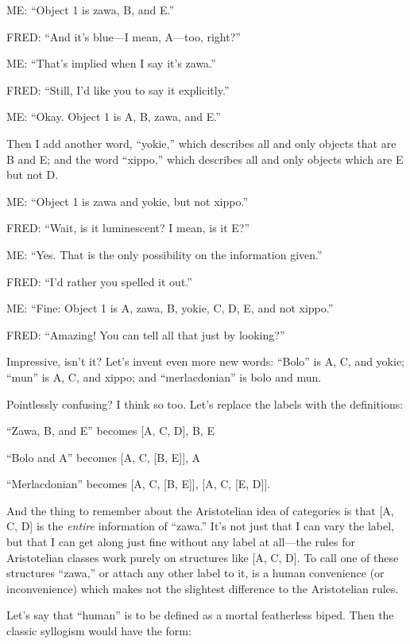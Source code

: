 {
 ME: ``Object 1 is zawa, B, and
E.''}

{
 FRED: ``And it's blue---I mean,
A---too, right?''}

{
 ME: ``That's implied when I say
it's zawa.''}

{
 FRED: ``Still, I'd like you to
say it explicitly.''}

{
 ME: ``Okay. Object 1 is A, B, zawa, and
E.''}

{
 Then I add another word,
``yokie,'' which describes all and
only objects that are B and E; and the word
``xippo,'' which describes all and
only objects which are E but not D.}

{
 ME: ``Object 1 is zawa and yokie, but not
xippo.''}

{
 FRED: ``Wait, is it luminescent? I mean, is it
E?''}

{
 ME: ``Yes. That is the only possibility on the
information given.''}

{
 FRED: ``I'd rather you spelled it
out.''}

{
 ME: ``Fine: Object 1 is A, zawa, B, yokie, C, D,
E, and not xippo.''}

{
 FRED: ``Amazing! You can tell all that just by
looking?''}

{
 Impressive, isn't it? Let's invent
even more new words: ``Bolo'' is A,
C, and yokie; ``mun'' is A, C, and
xippo; and ``merlacdonian'' is bolo
and mun.}

{
 Pointlessly confusing? I think so too. Let's
replace the labels with the definitions:}

{
 ``Zawa, B, and E'' becomes [A,
C, D], B, E}

{
 ``Bolo and A'' becomes [A, C,
[B, E]], A}

{
 ``Merlacdonian'' becomes [A, C,
[B, E]], [A, C, [E, {\textlnot}D]].}

{
 And the thing to remember about the Aristotelian idea of
categories is that [A, C, D] is the \textit{entire} information of
``zawa.'' It's not
just that I can vary the label, but that I can get along just fine
without any label at all---the rules for Aristotelian classes work
purely on structures like [A, C, D]. To call one of these structures
``zawa,'' or attach any other label
to it, is a human convenience (or inconvenience) which makes not the
slightest difference to the Aristotelian rules.}

{
 Let's say that
``human'' is to be defined as a
mortal featherless biped. Then the classic syllogism would have the
form:}

